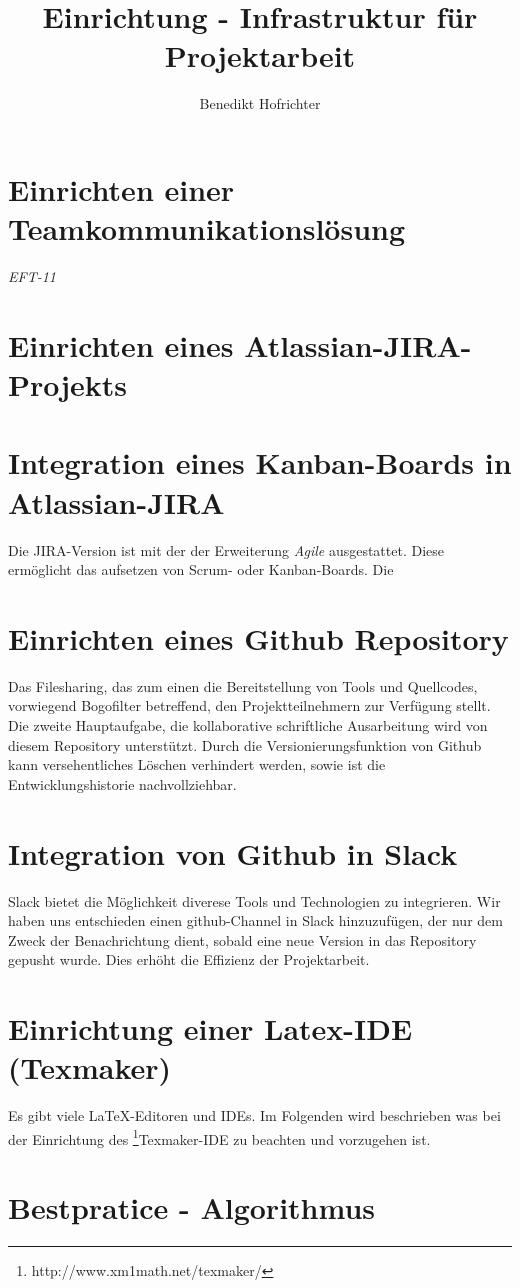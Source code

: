 \documentclass{article}
\begin{document}
\title{Einrichtung - Infrastruktur für Projektarbeit}
\author{Benedikt Hofrichter}
\maketitle

\section{Einrichten einer Teamkommunikationslösung}

\emph{EFT-11}

\section{Einrichten eines Atlassian-JIRA-Projekts}

\section{Integration eines Kanban-Boards in Atlassian-JIRA}
Die JIRA-Version ist mit der der Erweiterung \emph{Agile} ausgestattet. 
Diese ermöglicht das aufsetzen von Scrum- oder Kanban-Boards. Die 

\section{Einrichten eines Github Repository}
Das Filesharing, das zum einen die Bereitstellung von Tools und Quellcodes, vorwiegend Bogofilter betreffend, den Projektteilnehmern zur Verfügung stellt. Die zweite Hauptaufgabe, die kollaborative schriftliche Ausarbeitung wird von diesem Repository unterstützt. Durch die Versionierungsfunktion von Github kann versehentliches Löschen verhindert werden, sowie ist die Entwicklungshistorie nachvollziehbar. 

\section{Integration von Github in Slack}
Slack bietet die Möglichkeit diverese Tools und Technologien zu integrieren. Wir haben uns entschieden einen github-Channel in Slack hinzuzufügen, der nur dem Zweck der Benachrichtung dient, sobald eine neue Version in das Repository gepusht wurde. Dies erhöht die Effizienz der Projektarbeit.

\section{Einrichtung einer Latex-IDE (Texmaker)}
Es gibt viele LaTeX-Editoren und IDEs. Im Folgenden wird beschrieben was bei der Einrichtung des \footnote{\label{foot:2}http://www.xm1math.net/texmaker/}Texmaker-IDE zu beachten und vorzugehen ist.


\section{Bestpratice - Algorithmus}


\begin{thebibliography}{}

\end{thebibliography}
\end{document}
